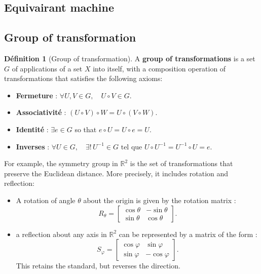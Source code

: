 \documentclass[a4paper,10pt]{article}
\theoremstyle{definition} %
\newtheorem{definition}{Définition}[section]
\theoremstyle{definition} %
\theoremstyle{definition} %
\theoremstyle{definition} %
\newcommand{\R}{\mathbb{R}}
\begin{document}
\subsection{Equivairant machine}
\subsection{Group of transformation}
\begin{definition}[Group of transformation]
    A \textbf{group of transformations} is a set \( G \) of applications of a set \( X \) into itself, with a composition operation of transformations that satisfies the following axioms:
    \begin{itemize}[topsep=-5pt]
    \item \textbf{Fermeture} : \( \forall U, V \in G, \quad U \circ V \in G \).
    \item \textbf{Associativité} : \( (U \circ V) \circ W = U \circ (V \circ W) \).
    \item \textbf{Identité} : \( \exists e \in G \) so that \( e \circ U = U \circ e = U \).
    \item \textbf{Inverses} : \( \forall U \in G, \quad \exists !\,U^{-1} \in G \text{ tel que } U \circ U^{-1} = U^{-1} \circ U = e \).
\end{itemize}
\end{definition}



For example, the symmetry group in $\R^2$ is the set of transformations that preserve the Euclidean distance. More precisely, it includes rotation and reflection:
\begin{itemize}
    \item A rotation of angle $\theta$ about the origin is given by the rotation matrix :\[
R_\theta =
\begin{bmatrix}
\cos \theta & -\sin \theta \\
\sin \theta & \cos \theta
\end{bmatrix}.
\]

\item a reflection about any axis in \( \mathbb{R}^2 \) can be represented by a matrix of the form :
\[
S_\varphi =
\begin{bmatrix}
\cos \varphi & \sin \varphi \\
\sin \varphi & -\cos \varphi
\end{bmatrix}.
\]
This retains the standard, but reverses the direction.
\end{itemize}
\end{document}
